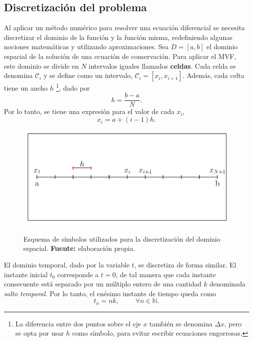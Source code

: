 \subsection{Discretización del problema}
Al aplicar un método numérico para resolver una ecuación diferencial se necesita discretizar el dominio de la función y la función misma, redefiniendo algunas nociones matemáticas y utilizando aproximaciones. Sea  $D = [a,b]$ el dominio espacial de la solución de una ecuación de conservación. Para aplicar el MVF, este dominio se divide en $N$ intervalos iguales llamados \textbf{celdas}. Cada celda se denomina $\mathcal{C}_i$ y se define como un intervalo, $\mathcal{C}_i = [x_i, x_{i+1}]$. Además, cada celta tiene un ancho $h$ \footnote{La diferencia entre dos puntos sobre el eje $x$ también se denomina $\Delta x$, pero se opta por usar $h$ como símbolo, para evitar escribir ecuaciones engorrosas.}, dado por
\begin{equation}
	h = \frac{b-a}{N}.
\end{equation}
Por lo tanto, se tiene una expresión para el valor de cada $x_i$,
\begin{equation}
	x_i = a + (i-1)h.
\end{equation} 
\begin{figure}[ht]
	\centering
	\includegraphics[width=\linewidth]{../some_plots/cap2/graficas/domain.pdf}
	\label{fig:discretizacion-eje-x}
	\caption{Esquema de símbolos utilizados para la discretización del dominio espacial. \textbf{Fuente:} elaboración propia.}
\end{figure}
El dominio temporal, dado por la variable $t$, se discretiza de forma similar. El instante inicial $t_0$ corresponde a $t=0$, de tal manera que cada instante consecuente está separado por un múltiplo entero de una cantidad $k$ denominada \textit{salto temporal}. Por lo tanto, el enésimo instante de tiempo queda como
\begin{equation}
	t_n = nk, \hspace{1cm} \forall n \in \mathbb{N}.
\end{equation}
